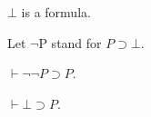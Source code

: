 \documentclass{article}
\newcommand{\imp}{\supset}
\newcommand{\deducible}{\vdash}
\newcommand{\falsum}{\bot}
\newcommand{\negate}{\lnot}
\begin{document}
\begin{forthel}
\begin{signature}[Falsum]
    $\falsum$ is a formula.
\end{signature}

Let $\negate$P stand for $P\imp\falsum$.

\begin{axiom}
    $\deducible\negate\negate P\imp P$.
\end{axiom}

\begin{proposition}[Explosion]
    $\deducible \falsum\imp P$.
\end{proposition}

\end{forthel}
\end{document}
